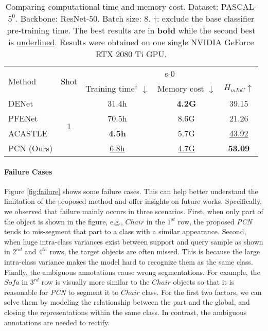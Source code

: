 \documentclass[journal]{IEEEtran}
\begin{document}
\begin{table}[ht]
    \centering
    \caption{Comparing computational time and memory cost. Dataset: PASCAL-$5^0$. Backbone: ResNet-$50$. Batch size: $8$. $\dag$: exclude the base classifier pre-training time. The best results are in \textbf{bold} while the second best is \underline{underlined}. Results were obtained on one single NVIDIA GeForce RTX $2080$ Ti GPU.}
\label{tab:compute}
\begin{tabular}{l|c|ccc}
    \hline
         \multirow{2}{*}{Method} & \multirow{2}{*}{Shot} & \multicolumn{3}{c}{s-0} \\
         \cline{3-5}
         & & Training time$^{\dag}$ $\downarrow$ & Memory cost $\downarrow$ & $H_{mIoU} \uparrow$  \\
         \hline
         DENet & \multirow{4}{*}{1} & 31.4h & \textbf{4.2G} & 39.15 \\
         PFENet & & 70.5h & 8.6G & 21.26 \\
         ACASTLE & & \textbf{4.5h} & 5.7G & \underline{43.92} \\
         PCN (Ours) & & \underline{6.8h} & \underline{4.7G} & \textbf{53.09}  \\
    \hline
    \end{tabular}
\end{table}

\paragraph{Failure Cases}
Figure \ref{fig:failure} shows some failure cases. This can help better understand the limitation of the proposed method and offer insights on future works. Specifically, we observed that failure mainly occurs in three scenarios. First, when only part of the object is shown in the figure, e.g., $Chair$ in the $1^{st}$ row, the proposed \textit{PCN} tends to mis-segment that part to a class with a similar appearance. Second, when huge intra-class variances exist between support and query sample as shown in $2^{nd}$ and $4^{th}$ rows, the target objects are often missed. This is because the large intra-class variance makes the model hard to recognize them as the same class. Finally, the ambiguous annotations cause wrong segmentations. For example, the $Sofa$ in $3^{rd}$ row is visually more similar to the $Chair$ objects so that it is reasonable for \textit{PCN} to segment it to $Chair$ class. For the first two factors, we can solve them by modeling the relationship between the part and the global, and closing the representations within the same class. In contrast, the ambiguous annotations are needed to rectify.
\end{document}
